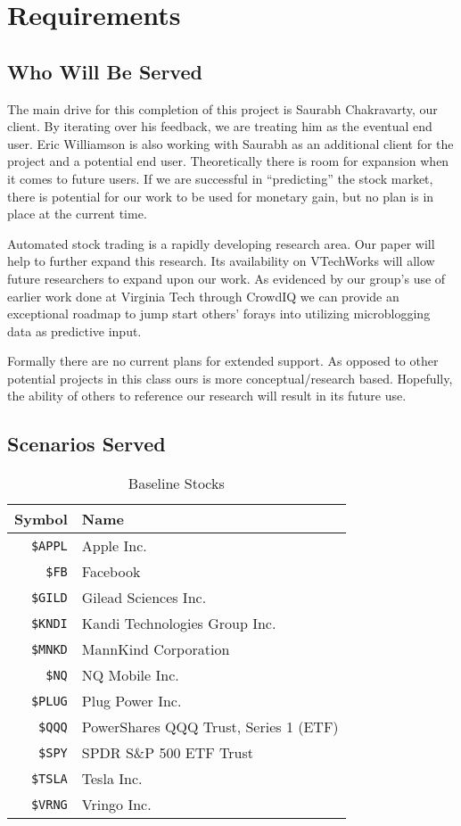 
\section{Requirements}

\subsection{Who Will Be Served}

The main drive for this completion of this project is Saurabh Chakravarty, our client. By iterating over his feedback, we are treating him as the eventual end user. Eric Williamson is also working with Saurabh as an additional client for the project and a potential end user.  Theoretically there is room for expansion when it comes to future users. If we are successful in “predicting” the stock market, there is potential for our work to be used for monetary gain, but no plan is in place at the current time. 

Automated stock trading is a rapidly developing research area. Our paper will help to further expand this research. Its availability on VTechWorks will allow future researchers to expand upon our work.  As evidenced by our group's use of earlier work done at Virginia Tech through CrowdIQ we can provide an exceptional roadmap to jump start others' forays into utilizing microblogging data as predictive input.  

Formally there are no current plans for extended support. As opposed to other potential projects in this class ours is more conceptual/research based. Hopefully, the ability of others to reference our research will result in its future use.

\subsection{Scenarios Served}

\begin{table}
  \centering
  \begin{tabular}{ | r | l | }
    \hline
    Symbol & Name \\ \hline
    \texttt{\$APPL} & Apple Inc. \\ \hline
    \texttt{\$FB} & Facebook \\ \hline
    \texttt{\$GILD} & Gilead Sciences Inc. \\ \hline
    \texttt{\$KNDI} & Kandi Technologies Group Inc. \\ \hline
    \texttt{\$MNKD} & MannKind Corporation \\ \hline
    \texttt{\$NQ} & NQ Mobile Inc. \\\hline
    \texttt{\$PLUG} & Plug Power Inc. \\\hline
    \texttt{\$QQQ} & PowerShares QQQ Trust, Series 1 (ETF) \\\hline
    \texttt{\$SPY} & SPDR S\&P 500 ETF Trust \\\hline
    \texttt{\$TSLA} & Tesla Inc. \\\hline
    \texttt{\$VRNG} & Vringo Inc. \\\hline
  \end{tabular}
  \caption{Baseline Stocks}\label{tab:stocks}
\end{table}

